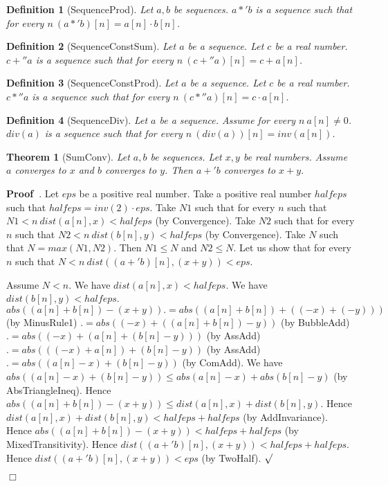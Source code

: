\documentclass{article}
\newenvironment{forthel}{\begin{leftbar}}{\end{leftbar}}
\newenvironment{proof}{\noindent\textbf{Proof\ }}{\hspace*{\fill}$\Box$\medskip}
\newenvironment{subproof}{\begin{list}{}{}
		\item[\text{Proof}]}{\hfill $\surd$ \end{list}}
\newtheorem{theorem}{Theorem}
\newtheorem{definition}{Definition}
\begin{document}
\begin{forthel}
	\begin{definition}[SequenceProd]
	Let $a,b$ be sequences. $a *' b$ is a sequence such that for every $n \ (a *' b)[n] = a[n] \cdot b[n]$.
	\end{definition}
	
	\begin{definition} [SequenceConstSum]
	Let $a$ be a sequence. Let $c$ be a real number. $c +'' a$ is a sequence such that for every $n \ (c +'' a)[n] = c + a[n]$.
	\end{definition}
	
	\begin{definition} [SequenceConstProd]
	Let $a$ be a sequence. Let $c$ be a real number. $c *'' a$ is a sequence such that for every $n \ (c *'' a)[n] = c \cdot a[n]$.
	\end{definition}

	\begin{definition} [SequenceDiv]
	Let $a$ be a sequence. Assume for every $n \ a[n] \neq 0$. $div(a)$ is a sequence such that for every $n \ (div(a))[n] = inv(a[n])$.
	\end{definition}
	
	\begin{theorem} [SumConv]
	Let $a,b$ be sequences. Let $x,y$ be real numbers. Assume $a$ converges to $x$ and $b$ converges to $y$.
	Then $a +' b$ converges to $x + y$.
	\end{theorem}
	\begin{proof}.
	Let $eps$ be a positive real number.
	Take a positive real number $halfeps$ such that $halfeps = inv(2) \cdot eps$.
	Take $N1$ such that for every $n$ such that $N1 < n \ dist(a[n],x) < halfeps$ (by Convergence).
	Take $N2$ such that for every $n$ such that $N2 < n \ dist(b[n],y) < halfeps$ (by Convergence).
	Take $N$ such that $N = max(N1,N2)$.
	Then $N1 \leq N$ and $N2 \leq N$.
	Let us show that for every $n$ such that $N < n \ dist((a +' b)[n],(x+y)) < eps$.
	\begin{subproof}
	Assume $N < n$.
	We have $dist(a[n],x) < halfeps$.
	We have $dist(b[n],y) < halfeps$.
	$abs((a[n] + b[n]) - (x + y)) .= abs((a[n] + b[n]) + ((-x) + (-y)))$ (by MinusRule1)
	$.= abs((-x) + ((a[n] + b[n]) - y))$ (by BubbleAdd)
	$.= abs((-x) + (a[n] + (b[n] - y)))$ (by AssAdd)
	$.= abs(((-x) + a[n]) + (b[n] - y))$ (by AssAdd)
	$.= abs((a[n] - x) + (b[n] - y))$ (by ComAdd).
	We have $abs((a[n] - x) + (b[n] - y)) \leq abs(a[n] - x) + abs(b[n] - y)$  (by AbsTriangleIneq).
	Hence $abs((a[n] + b[n]) - (x + y)) \leq dist(a[n],x) + dist(b[n],y)$.
	Hence $dist(a[n],x) + dist(b[n],y) < halfeps + halfeps$ (by AddInvariance).
	Hence $abs((a[n] + b[n]) - (x + y)) < halfeps + halfeps$ (by MixedTransitivity).
	Hence $dist((a +' b)[n],(x + y)) < halfeps + halfeps$.
	Hence $dist((a +' b)[n],(x + y)) < eps$ (by TwoHalf).
	\end{subproof}
	\end{proof}
	

\end{forthel}
\end{document}

